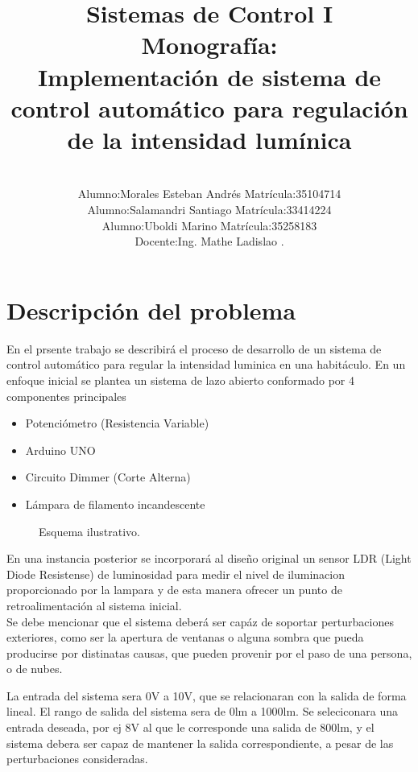 \documentclass[a4paper,11pt]{article}
\title{Sistemas de Control I \\ Monografía: 
\\Implementación de sistema de control automático para regulación de la intensidad lumínica\\}
\author{\\Alumno:Morales Esteban Andrés Matrícula:35104714\\
	  Alumno:Salamandri Santiago Matrícula:33414224\\
	  Alumno:Uboldi Marino Matrícula:35258183\\
	  Docente:Ing. Mathe Ladislao			.}
\begin{document}
\maketitle
\newpage
\tableofcontents
\newpage
\section{Descripción del problema}
En el prsente trabajo se describirá el proceso de desarrollo de un sistema de control automático para regular la intensidad luminica en una habitáculo.
En un enfoque inicial se plantea un sistema de lazo abierto conformado por 4 componentes principales
\begin{itemize}
	\item Potenciómetro (Resistencia Variable)
	\item Arduino UNO
	\item Circuito Dimmer (Corte Alterna)
	\item Lámpara de filamento incandescente
\end{itemize}

\begin{figure}[H] %
	\caption{Esquema ilustrativo.}
	\label{fig:esquema_ilustra}
\end{figure} 

En una instancia posterior se incorporará al diseño original un sensor LDR (Light Diode Resistense) de luminosidad para medir el nivel de iluminacion proporcionado por la lampara y de esta manera ofrecer un punto de retroalimentación al sistema inicial. 
\\
Se debe mencionar que el sistema deberá ser capáz de soportar perturbaciones exteriores, como ser la apertura de ventanas o alguna sombra que pueda producirse por distinatas causas, que pueden provenir por el paso de una persona, o de nubes.

La entrada del sistema sera 0V a 10V, que se relacionaran con la salida de forma lineal. El rango de salida del sistema sera de 0lm a 1000lm. Se seleciconara una entrada deseada, por ej 8V al que le corresponde una salida de 800lm, y el sistema debera ser capaz de mantener la salida correspondiente, a pesar de las perturbaciones consideradas.
\end{document}
